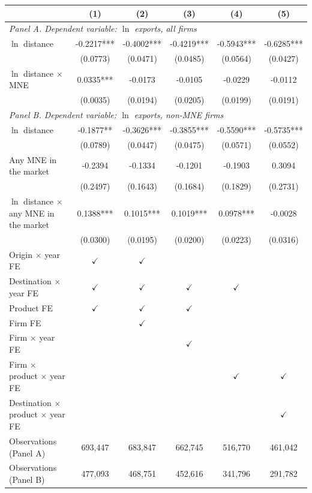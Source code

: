 \begin{tabular}{lccccc} \hline
 & (1) & (2) & (3) & (4) & (5) \\ \hline
\multicolumn{6}{l}{\textit{Panel A. Dependent variable: $\ln$ exports, all firms}} \\
$\ln$ distance & -0.2217*** & -0.4002*** & -0.4219*** & -0.5943*** & -0.6285*** \\
 & (0.0773) & (0.0471) & (0.0485) & (0.0564) & (0.0427) \\
$\ln$ distance $\times$ MNE & 0.0335*** & -0.0173 & -0.0105 & -0.0229 & -0.0112 \\
 & (0.0035) & (0.0194) & (0.0205) & (0.0199) & (0.0191) \\
\midrule
\multicolumn{6}{l}{\textit{Panel B. Dependent variable: $\ln$ exports, non-MNE firms}} \\
$\ln$ distance & -0.1877** & -0.3626*** & -0.3855*** & -0.5590*** & -0.5735*** \\
 & (0.0789) & (0.0447) & (0.0475) & (0.0571) & (0.0552) \\
Any MNE in the market & -0.2394 & -0.1334 & -0.1201 & -0.1903 & 0.3094 \\
 & (0.2497) & (0.1643) & (0.1684) & (0.1829) & (0.2731) \\
$\ln$ distance $\times$ any MNE in the market & 0.1388*** & 0.1015*** & 0.1019*** & 0.0978*** & -0.0028 \\
 & (0.0300) & (0.0195) & (0.0200) & (0.0223) & (0.0316) \\
\hline
Origin $\times$ year FE & $\checkmark$ & $\checkmark$ &  &  &  \\
Destination $\times$ year FE & $\checkmark$ & $\checkmark$ & $\checkmark$ & $\checkmark$ &  \\
Product FE & $\checkmark$ & $\checkmark$ & $\checkmark$ &  &  \\
Firm FE &  & $\checkmark$ &  &  &  \\
Firm $\times$ year FE &  &  & $\checkmark$ &  &  \\
Firm $\times$ product $\times$ year FE &  &  &  & $\checkmark$ & $\checkmark$ \\
Destination $\times$ product $\times$ year FE &  &  &  &  & $\checkmark$ \\
Observations (Panel A) & 693,447 & 683,847 & 662,745 & 516,770 & 461,042 \\
Observations (Panel B) & 477,093 & 468,751 & 452,616 & 341,796 & 291,782 \\
\hline
\end{tabular}
